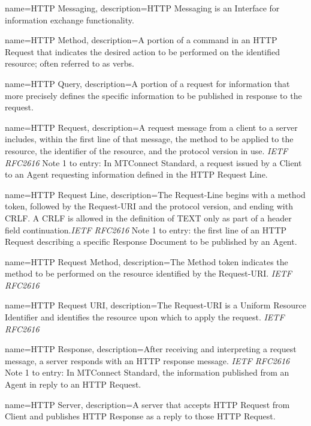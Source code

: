 {
    name={HTTP Messaging},
	description={\gls{HTTP Messaging} is an \gls{Interface} for information exchange functionality.}
}

{
    name={HTTP Method},
	description={A portion of a command in an \gls{HTTP Request} that indicates the desired action to be performed on the identified resource; often referred to as verbs.
}
}

{
    name={HTTP Query},
	description={A portion of a request for information that more precisely defines the specific information to be published in response to the request. }
}

{
    name={HTTP Request},
	description={A request message from a client to a server includes, within the first line of that message, the method to be applied to the resource, the identifier of the resource, and the protocol version in use. \textit{IETF RFC2616}
Note 1 to entry: In MTConnect Standard, a request issued by a \gls{Client} to an \gls{Agent} requesting information defined in the \gls{HTTP Request Line}.}
}

{
    name={HTTP Request Line},
	description={The Request-Line begins with a method token, followed by the Request-URI and the protocol version, and ending with CRLF. A CRLF is allowed in the definition of TEXT only as part of a header field continuation.\textit{IETF RFC2616}
Note 1 to entry: the first line of an \gls{HTTP Request} describing a specific \gls{Response Document} to be published by an \gls{Agent}.}
}

{
    name={HTTP Request Method},
	description={The Method  token indicates the method to be performed on the resource identified by the Request-URI. \textit{IETF RFC2616}}
}

{
    name={HTTP Request URI},
	description={The Request-URI is a Uniform Resource Identifier and identifies the resource upon which to apply the request. \textit{IETF RFC2616}}
}

{
    name={HTTP Response},
	description={After receiving and interpreting a request message, a server responds with an HTTP response message. \textit{IETF RFC2616}
Note 1 to entry: In MTConnect Standard, the information published from an \gls{Agent} in reply to an \gls{HTTP Request}. }
}

{
    name={HTTP Server},
	description={A server that accepts \gls{HTTP Request} from \gls{Client} and publishes \gls{HTTP Response} as a reply to those \gls{HTTP Request}.}
}

